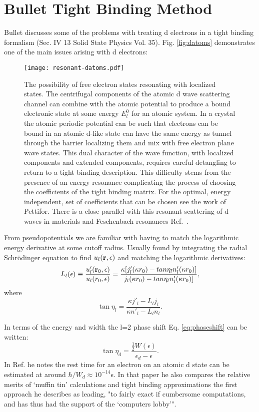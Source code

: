 \documentclass{article}
\def\r{{\bf r}}
\begin{document}
\section{Bullet Tight Binding Method}
\label{sec:bullet}
Bullet discusses some of the problems with treating d electrons in a tight binding 
formalism (Sec. IV 13 Solid State Physics Vol. 35). Fig. \ref{fig:datoms} demonstrates
one of the main issues arising with d electrons:
%
\begin{figure}
\texttt{[image: resonant-datoms.pdf]}
\caption{The possibility of free electron states resonating with localized states.
The centrifugal components of the atomic d wave scattering channel can combine with
the atomic potential to produce a bound electronic state at some energy $E^{0}_{l}$ for an atomic system.
In a crystal the atomic periodic potential can be such that electrons can be bound in an
atomic d-like state can have the same energy as tunnel through the barrier localizing them and mix with free electron 
plane wave states. This dual character of the wave function, with localized components and extended components, requires careful 
detangling to return to a tight binding description. This difficulty stems from the presence of an energy resonance 
complicating the process of choosing the coefficients of the tight binding matrix. For the optimal, energy independent,
set of coefficients that can be chosen see the work of Pettifor. There is a close parallel with this resonant scattering of d-waves in materials
and Feschenbach resonances Ref.~\cite{chin10}.}
\end{figure}
%

From pseudopotentials we are familiar with having to match the logarithmic energy
derivative at some cutoff radius. Usually found by integrating the radial
Schr\"odinger equation to find $u_{l}(\r,\epsilon)$ and matching the logarithmic derivatives:
%
\begin{equation}
L_{l}(\epsilon) \equiv \frac{u'_{l}(\r_{0},\epsilon)}{u_{l}(r_{0},\epsilon)} = \frac{\kappa[j'_{l}
(\kappa r_{0}) - tan \eta_{l} n'_{l}(\kappa r_{0})]} {j_{l}(\kappa r_{0}) - tan \eta_{l} n_{l}'(\kappa r_{0})]},
\end{equation}
%
where
\begin{equation}
\label{eq:phaseshift}
\tan \eta_{l} = \frac{\kappa j'_{l} - L_{l}j_{l}}{\kappa n'_{l} - L_{l}n_{l}}.
\end{equation}

In terms of the energy and width the l=2 phase shift Eq. \ref{eq:phaseshift} 
can be written:
%
\begin{equation}
\label{eq:dshift}
\tan \eta_{d} = \frac{\frac{1}{2}W(\epsilon)}{\epsilon_{d}-\epsilon}.
\end{equation}
%
In Ref. \cite{friedel73} he notes the rest time for an electron on an atomic d state 
can be estimated at around $\hbar/W_{d}\approx 10^{-14}$s. In that paper he also
compares the relative merits of `muffin tin' calculations and tight binding approximations
the first approach he describes as leading, "to fairly exact if cumbersome
computations, and has thus had the support of the `computers lobby'".
\end{document}
